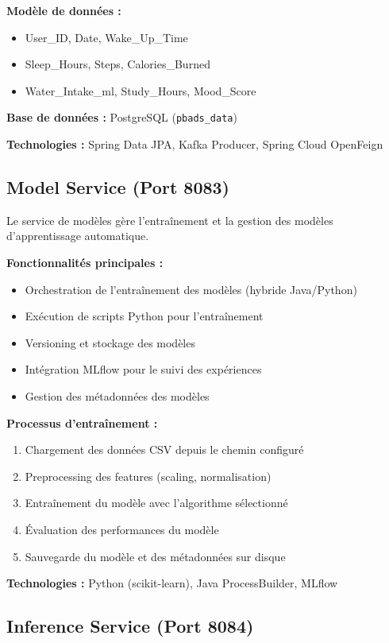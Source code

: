 \textbf{Modèle de données :}
\begin{itemize}
    \item User\_ID, Date, Wake\_Up\_Time
    \item Sleep\_Hours, Steps, Calories\_Burned
    \item Water\_Intake\_ml, Study\_Hours, Mood\_Score
\end{itemize}

\textbf{Base de données :} PostgreSQL (\texttt{pbads\_data})

\textbf{Technologies :} Spring Data JPA, Kafka Producer, Spring Cloud OpenFeign

\subsection{Model Service (Port 8083)}

Le service de modèles gère l'entraînement et la gestion des modèles d'apprentissage automatique.

\textbf{Fonctionnalités principales :}
\begin{itemize}
    \item Orchestration de l'entraînement des modèles (hybride Java/Python)
    \item Exécution de scripts Python pour l'entraînement
    \item Versioning et stockage des modèles
    \item Intégration MLflow pour le suivi des expériences
    \item Gestion des métadonnées des modèles
\end{itemize}

\textbf{Processus d'entraînement :}
\begin{enumerate}
    \item Chargement des données CSV depuis le chemin configuré
    \item Preprocessing des features (scaling, normalisation)
    \item Entraînement du modèle avec l'algorithme sélectionné
    \item Évaluation des performances du modèle
    \item Sauvegarde du modèle et des métadonnées sur disque
\end{enumerate}

\textbf{Technologies :} Python (scikit-learn), Java ProcessBuilder, MLflow

\subsection{Inference Service (Port 8084)}

